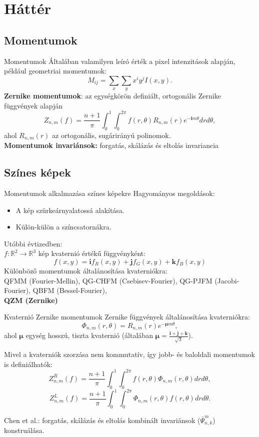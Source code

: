 \documentclass{beamer}
\newcommand{\R}{\mathbb{R}}
\newcommand{\qi}{\textbf{i}}
\newcommand{\qj}{\textbf{j}}
\newcommand{\qk}{\textbf{k}}
\newcommand{\qmu}{\boldsymbol{\mu}}
\def\R{{\mathbb R}}
\begin{document}
\section{Háttér}
\subsection{Momentumok}
\begin{frame}{Momentumok}
Általában valamilyen leíró érték a pixel intenzitások alapján, 
például geometriai momentumok: $$M_{ij} = \sum_x\sum_y x^i y^j I(x,y).$$
\textbf{Zernike momentumok}: az egységkörön definiált, ortogonális Zernike függvények alapján
$$Z_{n,m}(f) = \frac{n+1}{\pi}\int_0^1\int_0^{2\pi}f(r,\theta)R_{n,m}(r)e^{-\qi m\theta} dr d\theta,$$ ahol $R_{n,m}(r)$ az ortogonális, sugárirányú polinomok.\\

\textbf{Momentumok invariánsok:} forgatás, skálázás és eltolás invariancia 
\end{frame}

\subsection{Színes képek}
\begin{frame}{Momentumok alkalmazása színes képekre}
Hagyományos megoldások:
\begin{itemize}
    \item A kép szürkeárnyalatossá alakítása.
    \item Külön-külön a színcsatornákra.
\end{itemize}
Utóbbi évtizedben:\\
$f : \R^2 \rightarrow \R^3$ kép kvaternió értékű függvényként:
$$f(x,y) = \qi f_R(x,y) + \qj f_G(x,y) + \qk f_B(x,y)$$
Különböző momentumok általánosítása kvaterniókra:\\
QFMM (Fourier-Mellin), QG-CHFM (Csebisev-Fourier), QG-PJFM (Jacobi-Fourier), QBFM (Bessel-Fourier), \\
\textbf{QZM (Zernike)}
\end{frame}

\begin{frame}{Kvaternió Zernike momentumok}
\vskip 3mm
Zernike függvények általánosítása kvaterniókra: $$\Phi_{n,m}(r,\theta) = R_{n,m}(r)e^{-\qmu m \theta},$$ ahol $\qmu$ egység hosszú, tiszta kvaternió (általában $\qmu = \frac{\qi + \qj + \qk}{\sqrt{3}}$).

Mivel a kvaterniók szorzása nem kommutatív, így jobb- és baloldali momentumok is definiálhatók:
$$Z^R_{n,m}(f) = \frac{n+1}{\pi}\int_0^1\int_0^{2\pi}f(r,\theta)\Phi_{n,m}(r,\theta) dr d\theta,$$
$$Z^L_{n,m}(f) = \frac{n+1}{\pi}\int_0^1\int_0^{2\pi}\Phi_{n,m}(r,\theta)f(r,\theta) dr d\theta.$$

Chen et al.: forgatás, skálázás és eltolás kombinált invariánsok ($\overline{\Psi}_{n,k}^m$) konstruálása.
\end{frame}
\end{document}
